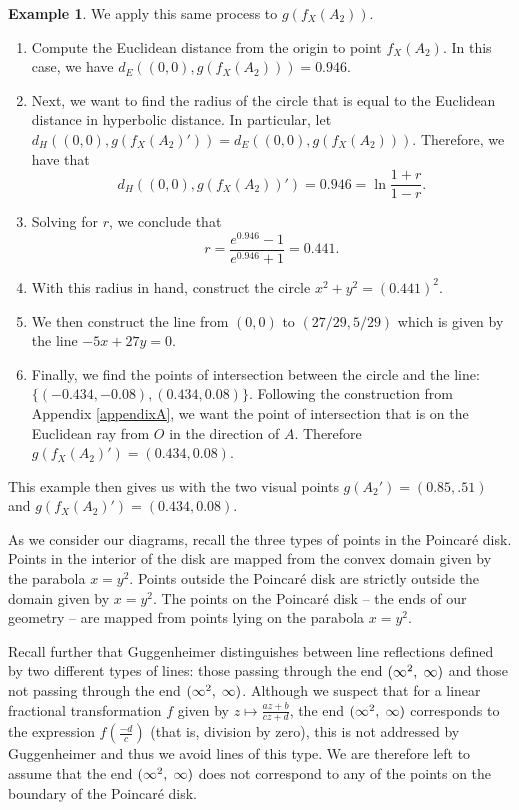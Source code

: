 \documentclass[12pt]{article}
\newcommand{\ttc}{, \hspace{1mm}}
\newcommand{\poincare}{Poincar\'{e} }
\newcommand{\specialend}{(\infty^2\ttc\infty)}
\theoremstyle{plain}
\theoremstyle{definition}
\newtheorem{example}[theorem]{Example}
\begin{document}
\begin{example}
We apply this same process to $g(f_X(A_2))$.

\begin{enumerate}
	\item Compute the Euclidean distance from the origin to point $f_X(A_2)$. In this case, we have $d_E((0,0),g(f_X(A_2))) = 0.946$.
	\item Next, we want to find the radius of the circle that is equal to the Euclidean distance in hyperbolic distance. In particular, let $d_H((0,0), g(f_X(A_2)')) = d_E((0,0), g(f_X(A_2)))$. Therefore, we have that
	\[
		d_H((0,0), g(f_X(A_2))') = 0.946 = \ln\frac{1 + r}{1 - r}.
	\]
	\item Solving for $r$, we conclude that 
	\[
		r = \frac{e^{0.946} - 1}{e^{0.946} + 1} = 0.441.
	\]
	\item With this radius in hand, construct the circle $x^2 + y^2 = (0.441)^2$.
	\item We then construct the line from $(0,0)$ to $(27/29,5/29)$ which is given by the line $-5x + 27y = 0$. 
	\item Finally, we find the points of intersection between the circle and the line: $\{(-0.434,-0.08),(0.434,0.08)\}$. Following the construction from Appendix \ref{appendixA}, we want the point of intersection that is on the Euclidean ray from $O$ in the direction of $A$. Therefore $g(f_X(A_2)') = (0.434, 0.08)$. 
\end{enumerate}

This example then gives us with the two visual points $g(A_2') = (0.85, .51)$ and $g(f_X(A_2)') = (0.434, 0.08)$.

\end{example}

As we consider our diagrams, recall the three types of points in the \poincare disk. Points in the interior of the disk are mapped from the convex domain given by the parabola $x = y^2$. Points outside the \poincare disk are strictly outside the domain given by $x = y^2$. The points on the \poincare disk -- the ends of our geometry -- are mapped from points lying on the parabola $x=y^2$.

Recall further that Guggenheimer distinguishes between line reflections defined by two different types of lines: those passing through the end $\specialend$ and those not passing through the end $\specialend$. Although we suspect that for a linear fractional transformation $f$ given by $z \mapsto \frac{az+b}{cz+d}$, the end $\specialend$ corresponds to the expression $f(\frac{-d}{c})$ (that is, division by zero), this is not addressed by Guggenheimer and thus we avoid lines of this type. We are therefore left to assume that the end $\specialend$ does not correspond to any of the points on the boundary of the \poincare disk. 
\end{document}
